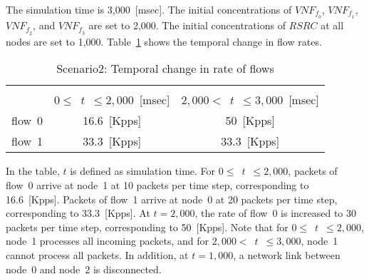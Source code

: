 \documentclass[technicalreport]{ieicej}
\begin{document}
	The simulation time is 3,000~[msec].
	The initial concentrations of $\mathit{VNF_{f_0}}$, $\mathit{VNF_{f_1}}$, $\mathit{VNF_{f_2}}$, and $\mathit{VNF_{f_3}}$ are set to 2,000.
	The initial concentrations of $\mathit{RSRC}$ at all nodes are set to 1,000.
	Table~\ref{tab:sce2_flow_parameters} shows the temporal change in flow rates.
	\begin{table}[!t]
		\centering
		\caption{Scenario2: Temporal change in rate of flows}
		\scalebox{1.0} {
			\label{tab:sce2_flow_parameters}
			\begin{tabular}{|c||c|c|} \hline
				\raisebox{-1em}{Flow} & \multicolumn{2}{c|}{\raisebox{-0.2em}{Rate}} \\ \cline{2-3}
				& $0 \le$~$t$~$\le 2,000$~[msec] & $2,000 <$~$t$~$\le 3,000$~[msec]  \\ \hline \hline
				flow~0 & 16.6~[Kpps] & 50~[Kpps]\\ \hline
				flow~1 & 33.3~[Kpps] & 33.3~[Kpps]\\ \hline
			\end{tabular}
		}
	\end{table}
	In the table, $t$ is defined as simulation time.
	For $0\le$~$t$~$\le2,000$, packets of flow~0 arrive at node~1 at 10 packets per time step, corresponding to 16.6~[Kpps].
	Packets of flow~1 arrive at node~0 at 20 packets per time step, corresponding to 33.3~[Kpps].
	At $t = 2,000$, the rate of flow~0 is increased to 30 packets per time step, corresponding to 50~[Kpps].
	Note that for $0\le$~$t$~$\le2,000$, node~1 processes all incoming packets, and for $2,000<$~$t$~$\le3,000$, node~1 cannot process all packets.
	In addition, at $t = 1,000$, a network link between node~0 and node~2 is disconnected.
\end{document}
